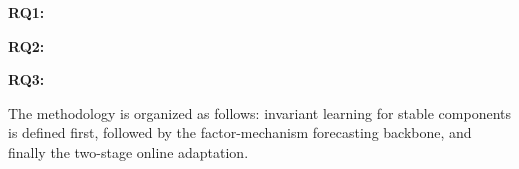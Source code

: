 ﻿\documentclass[journal]{IEEEtran}
\begin{document}
\textbf{RQ1:} 


\textbf{RQ2:} 


\textbf{RQ3:} 



The methodology is organized as follows: invariant learning for stable components is defined first, followed by the factor-mechanism forecasting backbone, and finally the two-stage online adaptation.
\end{document}
